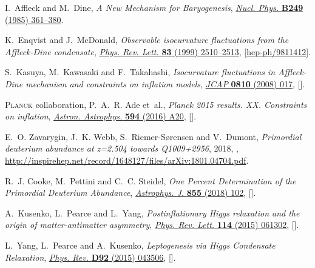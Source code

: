 \documentclass[11pt,a4paper]{article}
\begin{document}
\begin{thebibliography}{10}
I.~Affleck and M.~Dine, \emph{{A New Mechanism for Baryogenesis}},
  \href{https://doi.org/10.1016/0550-3213(85)90021-5}{\emph{Nucl. Phys.}
  {\bfseries B249} (1985) 361--380}.

K.~Enqvist and J.~McDonald, \emph{{Observable isocurvature fluctuations from
  the Affleck-Dine condensate}},
  \href{https://doi.org/10.1103/PhysRevLett.83.2510}{\emph{Phys. Rev. Lett.}
  {\bfseries 83} (1999) 2510--2513},
  [\href{https://arxiv.org/abs/hep-ph/9811412}{{\ttfamily hep-ph/9811412}}].

S.~Kasuya, M.~Kawasaki and F.~Takahashi, \emph{{Isocurvature fluctuations in
  Affleck-Dine mechanism and constraints on inflation models}},
  \href{https://doi.org/10.1088/1475-7516/2008/10/017}{\emph{JCAP} {\bfseries
  0810} (2008) 017}, [\href{https://arxiv.org/abs/0805.4245}{{}}].

{\scshape Planck} collaboration, P.~A.~R. Ade et~al., \emph{{Planck 2015
  results. XX. Constraints on inflation}},
  \href{https://doi.org/10.1051/0004-6361/201525898}{\emph{Astron. Astrophys.}
  {\bfseries 594} (2016) A20},
  [\href{https://arxiv.org/abs/1502.02114}{{}}].

E.~O. Zavarygin, J.~K. Webb, S.~Riemer-S{\o}rensen and V.~Dumont,
  \emph{{Primordial deuterium abundance at z=2.504 towards Q1009+2956}},  2018,
  \href{https://arxiv.org/abs/1801.04704}{{}},
  \href{http://inspirehep.net/record/1648127/files/arXiv:1801.04704.pdf}{http://inspirehep.net/record/1648127/files/arXiv:1801.04704.pdf}.

R.~J. Cooke, M.~Pettini and C.~C. Steidel, \emph{{One Percent Determination of
  the Primordial Deuterium Abundance}},
  \href{https://doi.org/10.3847/1538-4357/aaab53}{\emph{Astrophys. J.}
  {\bfseries 855} (2018) 102},
  [\href{https://arxiv.org/abs/1710.11129}{{}}].

A.~Kusenko, L.~Pearce and L.~Yang, \emph{{Postinflationary Higgs relaxation and
  the origin of matter-antimatter asymmetry}},
  \href{https://doi.org/10.1103/PhysRevLett.114.061302}{\emph{Phys. Rev. Lett.}
  {\bfseries 114} (2015) 061302},
  [\href{https://arxiv.org/abs/1410.0722}{{}}].

L.~Yang, L.~Pearce and A.~Kusenko, \emph{{Leptogenesis via Higgs Condensate
  Relaxation}}, \href{https://doi.org/10.1103/PhysRevD.92.043506}{\emph{Phys.
  Rev.} {\bfseries D92} (2015) 043506},
  [\href{https://arxiv.org/abs/1505.07912}{{}}].


\end{thebibliography}
\end{document}
